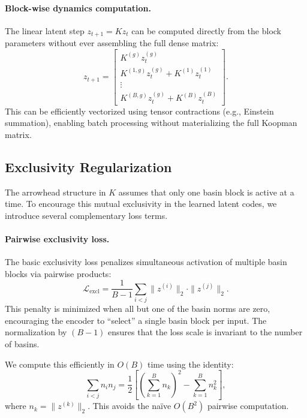 \paragraph{Block-wise dynamics computation.}
The linear latent step $z_{t+1} = K z_t$ can be computed directly from the block parameters without ever assembling the full dense matrix:
\begin{equation}
    z_{t+1} = \begin{bmatrix}
        K^{(g)} z^{(g)}_t \\
        K^{(1,g)} z^{(g)}_t + K^{(1)} z^{(1)}_t \\
        \vdots \\
        K^{(B,g)} z^{(g)}_t + K^{(B)} z^{(B)}_t
    \end{bmatrix}.
\end{equation}
This can be efficiently vectorized using tensor contractions (e.g., Einstein summation), enabling batch processing without materializing the full Koopman matrix.

\subsection{Exclusivity Regularization}
\label{sec:exclusivity}

The arrowhead structure in $K$ assumes that only one basin block is active at a time. To encourage this mutual exclusivity in the learned latent codes, we introduce several complementary loss terms.

\paragraph{Pairwise exclusivity loss.}
The basic exclusivity loss penalizes simultaneous activation of multiple basin blocks via pairwise products:
\begin{equation}
\label{eq:exclusivity}
    \mathcal{L}_{\text{excl}} = \frac{1}{B-1} \sum_{i < j} \|z^{(i)}\|_2 \cdot \|z^{(j)}\|_2.
\end{equation}
This penalty is minimized when all but one of the basin norms are zero, encouraging the encoder to ``select'' a single basin block per input. The normalization by $(B-1)$ ensures that the loss scale is invariant to the number of basins.

We compute this efficiently in $O(B)$ time using the identity:
\begin{equation}
    \sum_{i < j} n_i n_j = \frac{1}{2} \left[ \left( \sum_{k=1}^B n_k \right)^2 - \sum_{k=1}^B n_k^2 \right],
\end{equation}
where $n_k = \|z^{(k)}\|_2$. This avoids the na\"ive $O(B^2)$ pairwise computation.

